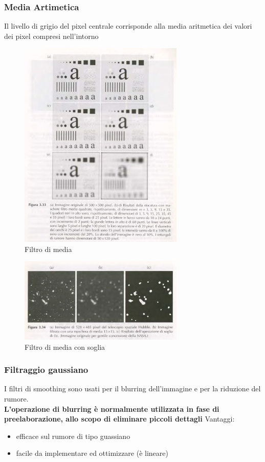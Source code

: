 \documentclass[12pt]{article}
\begin{document}
\subsubsection{Media Artimetica}
Il livello di grigio del pixel centrale corrisponde alla media aritmetica dei
valori dei pixel compresi nell’intorno
\begin{figure}[!htb]
    \centering
    \includegraphics[width=0.7\textwidth]{Images/media.png}
    \caption{Filtro di media}
\end{figure}
\FloatBarrier
\begin{figure}[!htb]
    \centering
    \includegraphics[width=0.7\textwidth]{Images/mediasoglia.png}
    \caption{Filtro di media con soglia}
\end{figure}
\FloatBarrier
\subsubsection{Filtraggio gaussiano}
I filtri di smoothing sono usati per il blurring dell’immagine e per la riduzione del rumore.
\\\textbf{L’operazione di blurring è normalmente utilizzata in fase di preelaborazione, allo scopo di eliminare piccoli dettagli}
Vantaggi:
\begin{itemize}
    \item efficace sul rumore di tipo guassiano
    \item facile da implementare ed ottimizzare (è lineare)
\end{itemize}
\end{document}
